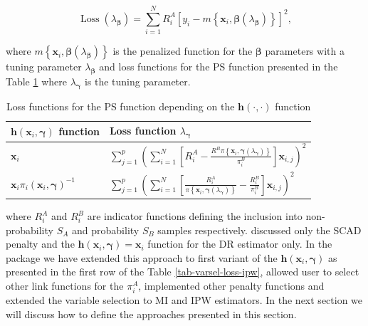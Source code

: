 \documentclass[
]{jss}
\begin{document}
\begin{equation}  
\operatorname{Loss}\left(\lambda_{\boldsymbol{\beta}}\right)=\sum_{i=1}^N R_i^A\left[y_i-m\left\{\boldsymbol{x}_i, \boldsymbol{\beta}(\lambda_{\boldsymbol{\beta}})\right\}\right]^2,
\label{eq-varsel-loss-mi}
\end{equation}

where
\(m\left\{\boldsymbol{x}_i, \boldsymbol{\beta}(\lambda_{\boldsymbol{\beta}})\right\}\)
is the penalized function for the \(\boldsymbol{\beta}\) parameters with
a tuning parameter \(\lambda_{\boldsymbol{\beta}}\) and loss functions
for the PS function presented in the Table \ref{tab-varsel-loss-ipw}
where \(\lambda_{\boldsymbol{\gamma}}\) is the tuning parameter.

\begin{table}[ht!]
\centering
\begin{tabular}{ll}
\hline
$\boldsymbol{h}(\boldsymbol{x}_i, \boldsymbol{\gamma})$ function &  Loss function $\lambda_{\boldsymbol{\gamma}}$ \\
\hline
$\boldsymbol{x}_i$ & $\sum_{j=1}^p\left(\sum_{i=1}^N\left[R_i^A - \frac{R^B\pi\left\{\boldsymbol{x}_i, \boldsymbol{\gamma}(\lambda_{\boldsymbol{\gamma}})\right\}}{\pi_i^B}\right] \boldsymbol{x}_{i, j}\right)^2$\\
\hline
$\boldsymbol{x}_i \pi_i(\boldsymbol{x}_i, \boldsymbol{\gamma})^{-1}$ & $\sum_{j=1}^p\left(\sum_{i=1}^N\left[\frac{R_i^A}{\pi\left\{\boldsymbol{x}_i, \boldsymbol{\gamma}(\lambda_{\boldsymbol{\gamma}})\right\}}-\frac{R_i^B}{\pi_i^B}\right] \boldsymbol{x}_{i, j}\right)^2$ \\
\hline
\end{tabular}
\caption{Loss functions for the PS function depending on the $\boldsymbol{h}(\cdot,\cdot)$ function}
\label{tab-varsel-loss-ipw}
\end{table}

where \(R_i^A\) and \(R_i^B\) are indicator functions defining the
inclusion into non-probability \(S_A\) and probability \(S_B\) samples
respectively. \citet{yang_doubly_2020} discussed only the SCAD penalty
and the
\(\boldsymbol{h}(\boldsymbol{x}_i, \boldsymbol{\gamma})=\boldsymbol{x}_i\)
function for the DR estimator only. In the  package we
have extended this approach to first variant of the
\(\boldsymbol{h}(\boldsymbol{x}_i, \boldsymbol{\gamma})\) as presented
in the first row of the Table \eqref{tab-varsel-loss-ipw}, allowed user
to select other link functions for the \(\pi_i^A\), implemented other
penalty functions and extended the variable selection to MI and IPW
estimators. In the next section we will discuss how to define the
approaches presented in this section.
\end{document}
